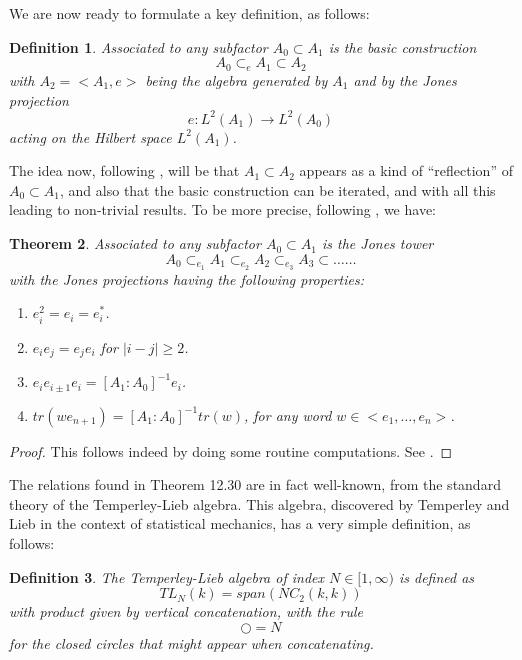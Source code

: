 \documentclass[12pt]{amsbook}
\newtheorem{theorem}{Theorem}[chapter]
\newtheorem{definition}[theorem]{Definition}
\begin{document}
We are now ready to formulate a key definition, as follows:


\begin{definition}
Associated to any subfactor $A_0\subset A_1$ is the basic construction
$$A_0\subset_eA_1\subset A_2$$
with $A_2=<A_1,e>$ being the algebra generated by $A_1$ and by the Jones projection
$$e:L^2(A_1)\to L^2(A_0)$$
acting on the Hilbert space $L^2(A_1)$.
\end{definition}

The idea now, following \cite{jo1}, will be that $A_1\subset A_2$ appears as a kind of ``reflection'' of $A_0\subset A_1$, and also that the basic construction can be iterated, and with all this leading to non-trivial results. To be more precise, following \cite{jo1}, we have:


\begin{theorem}
Associated to any subfactor $A_0\subset A_1$ is the Jones tower
$$A_0\subset_{e_1}A_1\subset_{e_2}A_2\subset_{e_3}A_3\subset\ldots\ldots$$
with the Jones projections having the following properties:
\begin{enumerate}
\item $e_i^2=e_i=e_i^*$.

\item $e_ie_j=e_je_i$ for $|i-j|\geq2$.

\item $e_ie_{i\pm1}e_i=[A_1:A_0]^{-1}e_i$.

\item $tr(we_{n+1})=[A_1:A_0]^{-1}tr(w)$, for any word $w\in<e_1,\ldots,e_n>$.
\end{enumerate}
\end{theorem}

\begin{proof}
This follows indeed by doing some routine computations. See \cite{jo1}.
\end{proof}

The relations found in Theorem 12.30 are in fact well-known, from the standard theory of the Temperley-Lieb algebra. This algebra, discovered by Temperley and Lieb in the context of statistical mechanics, has a very simple definition, as follows:


\begin{definition}
The Temperley-Lieb algebra of index $N\in[1,\infty)$ is defined as
$$TL_N(k)=span(NC_2(k,k))$$
with product given by vertical concatenation, with the rule
$$\bigcirc=N$$
for the closed circles that might appear when concatenating.
\end{definition}
\end{document}
